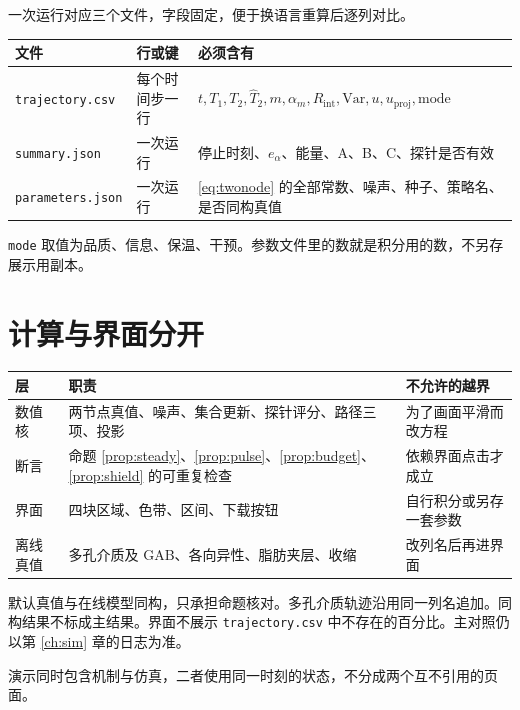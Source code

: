 一次运行对应三个文件，字段固定，便于换语言重算后逐列对比。

\begin{center}
\begin{tabularx}{\textwidth}{llX}
\toprule
文件 & 行或键 & 必须含有 \\
\midrule
\texttt{trajectory.csv} & 每个时间步一行 & $t,T_1,T_2,\hat T_2,m,\alpha_m,R_{\mathrm{int}},\mathrm{Var},u,u_{\mathrm{proj}},\mathrm{mode}$ \\
\texttt{summary.json} & 一次运行 & 停止时刻、$e_{\alpha}$、能量、A、B、C、探针是否有效 \\
\texttt{parameters.json} & 一次运行 & \eqref{eq:twonode} 的全部常数、噪声、种子、策略名、是否同构真值 \\
\bottomrule
\end{tabularx}
\end{center}

\texttt{mode} 取值为品质、信息、保温、干预。参数文件里的数就是积分用的数，不另存展示用副本。

\section{计算与界面分开}

\begin{center}
\begin{tabularx}{\textwidth}{lXX}
\toprule
层 & 职责 & 不允许的越界 \\
\midrule
数值核 & 两节点真值、噪声、集合更新、探针评分、路径三项、投影 & 为了画面平滑而改方程 \\
断言 & 命题 \ref{prop:steady}、\ref{prop:pulse}、\ref{prop:budget}、\ref{prop:shield} 的可重复检查 & 依赖界面点击才成立 \\
界面 & 四块区域、色带、区间、下载按钮 & 自行积分或另存一套参数 \\
离线真值 & 多孔介质及 GAB、各向异性、脂肪夹层、收缩 & 改列名后再进界面 \\
\bottomrule
\end{tabularx}
\end{center}

默认真值与在线模型同构，只承担命题核对。多孔介质轨迹沿用同一列名追加。同构结果不标成主结果。界面不展示 \texttt{trajectory.csv} 中不存在的百分比。主对照仍以第 \ref{ch:sim} 章的日志为准。

演示同时包含机制与仿真，二者使用同一时刻的状态，不分成两个互不引用的页面。

